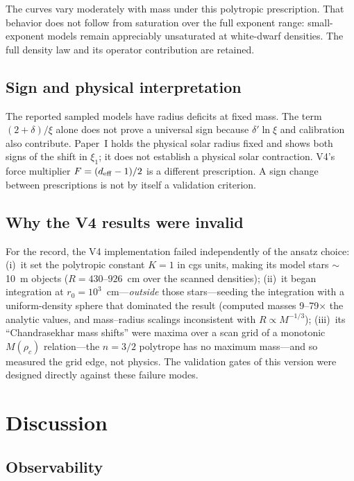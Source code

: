 \documentclass[twocolumn,prd,superscriptaddress,nofootinbib]{revtex4-2}
\begin{document}
The curves vary moderately with mass under this polytropic prescription.
That behavior does not follow from saturation over the full exponent range:
small-exponent models remain appreciably unsaturated at white-dwarf densities.
The full density law and its operator contribution are retained.

\subsection{Sign and physical interpretation}

The reported sampled models have radius deficits at fixed mass.
The term $(2+\delta)/\xi$ alone does not prove a universal sign because
$\delta'\ln\xi$ and calibration also contribute. Paper~I holds the
physical solar radius fixed and shows both signs of the shift in
$\xi_1$; it does not establish a physical solar contraction. V4's force
multiplier $F=(d_{\rm eff}-1)/2$ is a different prescription. A sign
change between prescriptions is not by itself a validation criterion.

\subsection{Why the V4 results were invalid}
\label{sec:v4}

For the record, the V4 implementation failed independently of the ansatz
choice: (i)~it set the polytropic constant $K = 1$ in cgs units, making
its model stars $\sim$10~m objects ($R = 430$--$926$~cm over the scanned
densities); (ii)~it began integration at $r_0 = 10^3$~cm---\emph{outside}
those stars---seeding the integration with a uniform-density sphere that
dominated the result (computed masses 9--79$\times$ the analytic values,
and mass--radius scalings inconsistent with $R \propto M^{-1/3}$);
(iii)~its ``Chandrasekhar mass shifts'' were maxima over a scan grid of a
monotonic $M(\rho_c)$ relation---the $n = 3/2$ polytrope has no maximum
mass---and so measured the grid edge, not physics. The validation gates
of this version were designed directly against these failure modes.

\section{Discussion}

\subsection{Observability}
\end{document}
